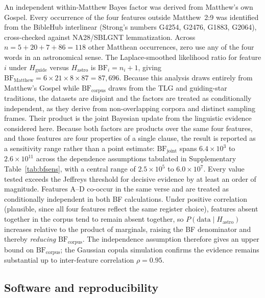 \documentclass[sn-nature]{sn-jnl}
\begin{document}
An independent within-Matthew Bayes factor was derived from Matthew's own
Gospel. Every occurrence of the four features outside Matthew~2:9 was
identified from the BibleHub interlinear (Strong's numbers G4254, G2476,
G1883, G2064), cross-checked against NA28/SBLGNT lemmatization.
Across $n=5+20+7+86=118$ other Matthean occurrences, zero use any of the
four words in an astronomical sense. The Laplace-smoothed likelihood ratio
for feature $i$ under $H_\text{guide}$ versus $H_\text{astro}$ is
$\mathrm{BF}_i=n_i+1$, giving
$\mathrm{BF}_\text{Matthew}=6\times21\times8\times87=87{,}696$.
Because this analysis draws entirely from Matthew's Gospel while
$\mathrm{BF}_\text{corpus}$ draws from the TLG and guiding-star traditions,
the datasets are disjoint and the factors are treated as conditionally
independent, as they derive from non-overlapping corpora and distinct
sampling frames.
Their product is the joint Bayesian update from the linguistic evidence
considered here. Because both factors are products over the same four
features, and those features are four properties of a single clause, the
result is reported as a sensitivity range rather than a point estimate:
$\mathrm{BF}_\text{joint}$ spans $6.4\times10^{3}$ to $2.6\times10^{11}$
across the dependence assumptions tabulated in Supplementary
Table~\ref{tab:bfsens}, with a central range of $2.5\times10^{5}$ to
$6.0\times10^{7}$. Every value tested exceeds the Jeffreys threshold for
decisive evidence by at least an order of magnitude.
Features A--D co-occur in the same verse and are treated as conditionally
independent in both BF calculations. Under positive correlation (plausible,
since all four features reflect the same register choice), features absent
together in the corpus tend to remain absent together, so
$P(\text{data}\mid H_\text{astro})$ increases relative to the product of
marginals, raising the BF denominator and thereby \emph{reducing}
$\mathrm{BF}_\text{corpus}$. The independence assumption therefore gives an
upper bound on $\mathrm{BF}_\text{corpus}$; the Gaussian copula simulation
confirms the evidence remains substantial up to inter-feature correlation
$\rho=0.95$.

\subsection{Software and reproducibility}
\end{document}

